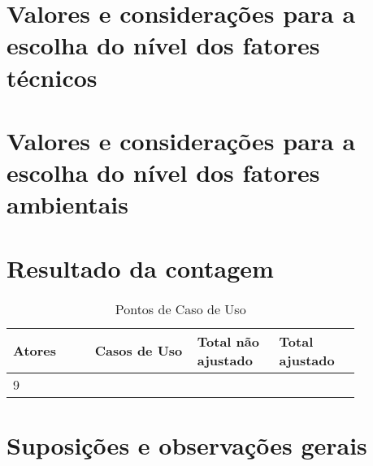   

\section{Valores e considerações para a escolha do nível dos fatores técnicos}

\section{Valores e considerações para a escolha do nível dos fatores ambientais}

\vfill
\pagebreak
\section{Resultado da contagem}

\begin{table*}[!h]
\centering
\caption{Pontos de Caso de Uso}
\label{Rotulo}
  \begin{tabular}{|p{0.20\linewidth}|p{0.25\linewidth}|p{0.20\linewidth}|p{0.20\linewidth}|}
  \hline
  \textbf{Atores} & \textbf{Casos de Uso} & \textbf{Total não ajustado} & \textbf{Total ajustado} \\ 
  \hline

  9 & & &\\
  \hline
  \end{tabular}
\end{table*}

\section{Suposições e observações gerais}

